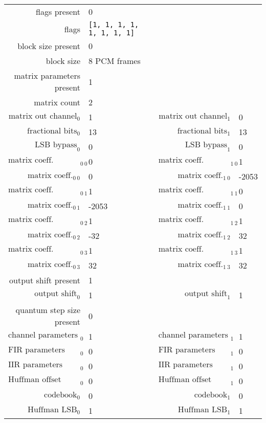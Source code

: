 \begin{table}[h]
{
  \begin{tabular}{rlrl}
    \hline
    flags present & 0 \\
    flags & \texttt{[1, 1, 1, 1, 1, 1, 1, 1]} \\
    \hline
    block size present & 0 \\
    block size & 8 PCM frames \\
    \hline
    matrix parameters present & 1 \\
    matrix count & 2 \\
    $\text{matrix out channel}_0$ & 1 &
    $\text{matrix out channel}_1$ & 0 \\
    $\text{fractional bits}_0$ & 13 &
    $\text{fractional bits}_1$ & 13 \\
    $\text{LSB bypass}_0$ & 0 &
    $\text{LSB bypass}_1$ & 0 \\
    $\text{matrix coeff. present}_{0~0}$ & 0 &
    $\text{matrix coeff. present}_{1~0}$ & 1 \\
    $\text{matrix coeff.}_{0~0}$ & 0 &
    $\text{matrix coeff.}_{1~0}$ & -2053 \\
    $\text{matrix coeff. present}_{0~1}$ & 1 &
    $\text{matrix coeff. present}_{1~1}$ & 0 \\
    $\text{matrix coeff.}_{0~1}$ & -2053 &
    $\text{matrix coeff.}_{1~1}$ & 0 \\
    $\text{matrix coeff. present}_{0~2}$ & 1 &
    $\text{matrix coeff. present}_{1~2}$ & 1 \\
    $\text{matrix coeff.}_{0~2}$ & -32 &
    $\text{matrix coeff.}_{1~2}$ & 32 \\
    $\text{matrix coeff. present}_{0~3}$ & 1 &
    $\text{matrix coeff. present}_{1~3}$ & 1 \\
    $\text{matrix coeff.}_{0~3}$ & 32 &
    $\text{matrix coeff.}_{1~3}$ & 32 \\
    \hline
    output shift present & 1 \\
    $\text{output shift}_0$ & 1 &
    $\text{output shift}_1$ & 1 \\
    \hline
    quantum step size present & 0 \\
    \hline
    $\text{channel parameters present}_0$ & 1 &
    $\text{channel parameters present}_1$ & 1 \\
    $\text{FIR parameters present}_0$ & 0 &
    $\text{FIR parameters present}_1$ & 0 \\
    $\text{IIR parameters present}_0$ & 0 &
    $\text{IIR parameters present}_1$ & 0 \\
    $\text{Huffman offset present}_0$ & 0 &
    $\text{Huffman offset present}_1$ & 0 \\
    $\text{codebook}_0$ & 0 &
    $\text{codebook}_1$ & 0 \\
    $\text{Huffman LSB}_0$ & 1 &
    $\text{Huffman LSB}_1$ & 1 \\
    \hline
  \end{tabular}
}
\end{table}

